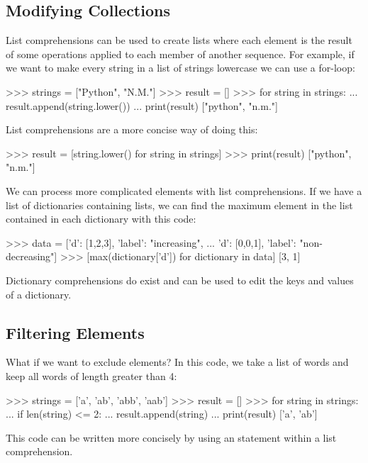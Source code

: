 \documentclass[11pt]{cselabheader}
\begin{document}
\subsection{Modifying Collections}
List comprehensions can be used to create lists where each element is the
result of some operations applied to each member of another sequence. For
example, if we want to make every string in a list of strings lowercase we can
use a for-loop:

\begin{pyconcode}
>>> strings = ["Python", "N.M."]
>>> result = []
>>> for string in strings:
...    result.append(string.lower())
... print(result)
["python", "n.m."]
\end{pyconcode}

List comprehensions are a more concise way of doing this:

\begin{pyconcode}
>>> result = [string.lower() for string in strings]
>>> print(result)
["python", "n.m."]
\end{pyconcode}

We can process more complicated elements with list comprehensions.
If we have a list of dictionaries containing lists, we can find the maximum
element in the list contained in each dictionary with this code:
\begin{pyconcode}
>>> data = [{'d': [1,2,3], 'label': "increasing"},
...         {'d': [0,0,1], 'label': "non-decreasing"}]
>>> [max(dictionary['d']) for dictionary in data]
[3, 1]
\end{pyconcode}

Dictionary comprehensions do exist and can be used to edit the keys and
values of a dictionary.

\subsection{Filtering Elements}
What if we want to exclude elements?
In this code, we take a list of words and keep all words of length greater
than 4:

\begin{pyconcode}
>>> strings = ['a', 'ab', 'abb', 'aab']
>>> result = []
>>> for string in strings:
...    if len(string) <= 2:
...        result.append(string)
... print(result)
['a', 'ab']
\end{pyconcode}

This code can be written more concisely by using an 
statement within a list comprehension.
\end{document}

